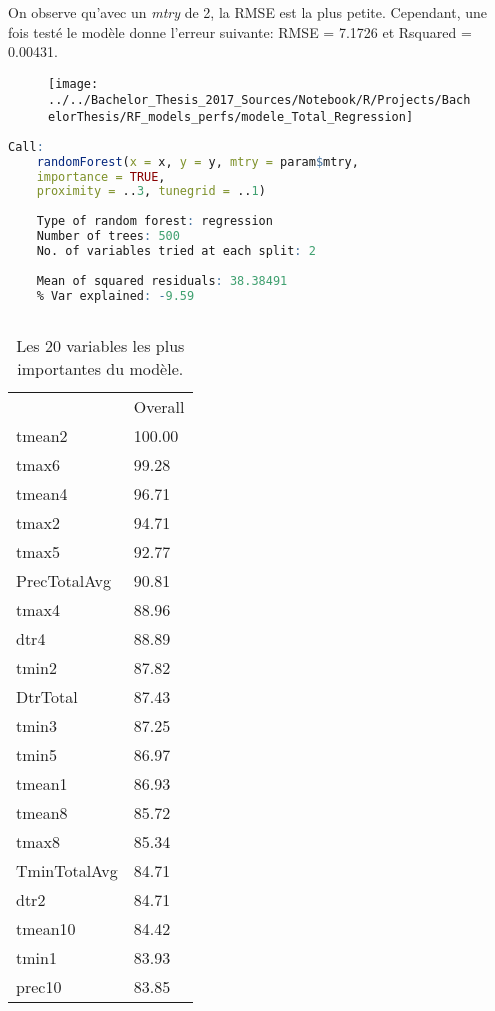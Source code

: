 \noindent On observe qu'avec un \textit{mtry} de 2, la RMSE est la plus petite. Cependant, une fois testé le modèle donne l'erreur suivante: RMSE = 7.1726 et Rsquared = 0.00431. 


\begin{figure}[H]
	\centering
	\texttt{[image: ../../Bachelor\_Thesis\_2017\_Sources/Notebook/R/Projects/BachelorThesis/RF\_models\_perfs/modele\_Total\_Regression]}
	\caption{}
	\label{fig:modeletotalregression}
\end{figure}

\begin{minipage}{\linewidth}
	
	\begin{lstlisting}[showstringspaces=false,language=R, caption={Test du modèle de classification},captionpos=b]
	Call:
	randomForest(x = x, y = y, mtry = param$mtry, 
	importance = TRUE,
	proximity = ..3, tunegrid = ..1) 
	
	Type of random forest: regression
	Number of trees: 500
	No. of variables tried at each split: 2
	
	Mean of squared residuals: 38.38491
	% Var explained: -9.59
	
	\end{lstlisting}
\end{minipage}


\begin{table}[H]
	\centering
	\caption{Les 20 variables les plus importantes du modèle.}
	\label{RF_Total_Varimp}
	\begin{tabular}{ll}
		& Overall \\
		tmean2       & 100.00  \\
		tmax6        & 99.28   \\
		tmean4       & 96.71   \\
		tmax2        & 94.71   \\
		tmax5        & 92.77   \\
		PrecTotalAvg & 90.81   \\
		tmax4        & 88.96   \\
		dtr4         & 88.89   \\
		tmin2        & 87.82   \\
		DtrTotal     & 87.43   \\
		tmin3        & 87.25   \\
		tmin5        & 86.97   \\
		tmean1       & 86.93   \\
		tmean8       & 85.72   \\
		tmax8        & 85.34   \\
		TminTotalAvg & 84.71   \\
		dtr2         & 84.71   \\
		tmean10      & 84.42   \\
		tmin1        & 83.93   \\
		prec10       & 83.85  
	\end{tabular}
\end{table}




